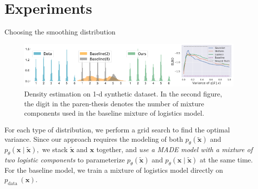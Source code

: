 \documentclass[t]{beamer}  %
\begin{document}
\section{Experiments \cite{orig}}
\begin{frame}{Choosing  the smoothing distribution}
\begin{figure}[h]
    \centering
    
    \includegraphics[width=\textwidth]{distrs.pdf}
    \caption[c]{Density estimation on 1-d synthetic dataset.  In the second figure, the digit in the paren-thesis denotes the number of mixture components used in the baseline mixture of logistics model.}
\end{figure}
For each type of distribution, we perform a grid search to find the optimal variance. Since our approach requires the modeling of both $p_{\theta}(\tilde{\bm{x}})$ and $p_{\theta}(\bm{x} \mid \tilde{\bm{x}}),$ we stack $\tilde{\bm{x}}$ and $\bm{x}$ together, and \newline
\emph{use a MADE model \cite{MADE} with a mixture of two logistic components} to parameterize $p_{\theta}(\tilde{\bm{x}})$ and $p_{\theta}(\bm{x} \mid \tilde{\bm{x}})$ at the same time. For the baseline model, we train a mixture of logistics model directly on $p_{\text {data }}(\bm{x})$.
\end{frame}
\end{document}
